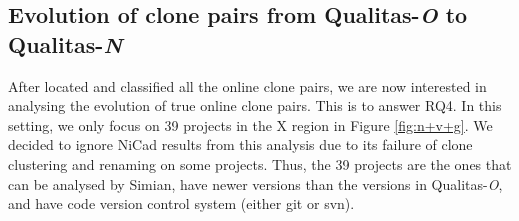\documentclass{IEEEtran}
\begin{document}
\subsection{Evolution of clone pairs from Qualitas-\textit{O} to Qualitas-\textit{N}}
After located and classified all the online clone pairs, we are now interested in analysing the evolution of true online clone pairs. This is to answer RQ4. In this setting, we only focus on 39 projects in the X region in Figure \ref{fig:n+v+g}. We decided to ignore NiCad results from this analysis due to its failure of clone clustering and renaming on some projects.  Thus, the 39 projects are the ones that can be analysed by Simian, have newer versions than the versions in Qualitas-\textit{O}, and have code version control system (either git or svn). %
\end{document}
